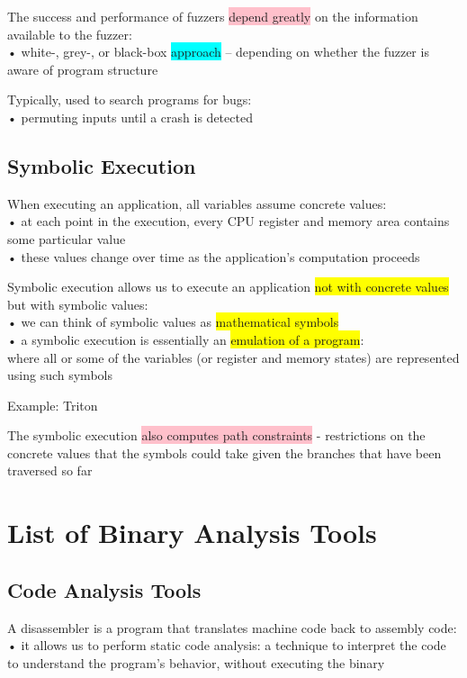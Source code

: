 \documentclass[]{project_plan}
\begin{document}
The success and performance of fuzzers \colorbox{pink}{depend greatly} on the information
available to the fuzzer:\\
• white-, grey-, or black-box \colorbox{cyan}{approach} – depending on whether the fuzzer is aware of
program structure

Typically, used to search programs for bugs:\\
• permuting inputs until a crash is detected

\subsection{Symbolic Execution}

When executing an application, all variables assume concrete values:\\
• at each point in the execution, every CPU register and memory area contains some
particular value\\
• these values change over time as the application’s computation proceeds

Symbolic execution allows us to execute an application \colorbox{yellow}{not with concrete values} but
with symbolic values:\\
• we can think of symbolic values as \colorbox{yellow}{mathematical symbols}\\
• a symbolic execution is essentially an \colorbox{yellow}{emulation of a program}:\\
where all or some of the variables (or register and memory states) are represented using such
symbols

Example: Triton

The symbolic execution \colorbox{pink}{also computes path constraints} - restrictions on the
concrete values that the symbols could take given the branches that have
been traversed so far

\section{List of Binary Analysis Tools}

\subsection{Code Analysis Tools}
A disassembler is a program that translates machine code back to assembly code:\\
• it allows us to perform static code analysis: a technique to interpret the code to
understand the program’s behavior, without executing the binary
\end{document}
